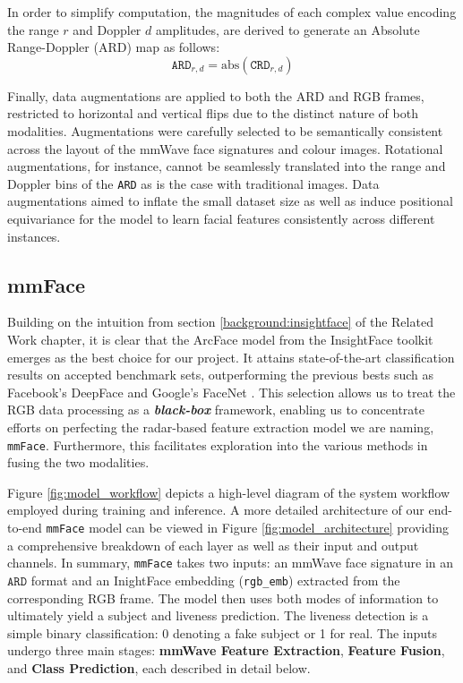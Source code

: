 \documentclass{mpaper}
\begin{document}
In order to simplify computation, the magnitudes of each complex value encoding the range $r$ and Doppler $d$ amplitudes, are derived to generate an Absolute Range-Doppler (ARD) map as follows:
$$\mathtt{ARD}_{r\!,d} = \text{abs}(\mathtt{CRD}_{r\!,d})$$

Finally, data augmentations are applied to both the ARD and RGB frames, restricted to horizontal and vertical flips due to the distinct nature of both modalities. Augmentations were carefully selected to be semantically consistent across the layout of the mmWave face signatures and colour images. Rotational augmentations, for instance, cannot be seamlessly translated into the range and Doppler bins of the \texttt{ARD} as is the case with traditional images. Data augmentations aimed to inflate the small dataset size as well as induce positional equivariance for the model to learn facial features consistently across different instances.


\subsection{mmFace}
Building on the intuition from section \ref{background:insightface} of the Related Work chapter, it is clear that the ArcFace model from the InsightFace toolkit emerges as the best choice for our project. It attains state-of-the-art classification results on accepted benchmark sets, outperforming the previous bests such as Facebook's DeepFace \cite{taigman2014deepface} and Google's FaceNet \cite{schroff2015facenet}. This selection allows us to treat the RGB data processing as a \textbf{\textit{black-box}} framework, enabling us to concentrate efforts on perfecting the radar-based feature extraction model we are naming, \texttt{mmFace}. Furthermore, this facilitates exploration into the various methods in fusing the two modalities. 

Figure \ref{fig:model_workflow} depicts a high-level diagram of the system workflow employed during training and inference. A more detailed architecture of our end-to-end \texttt{mmFace} model can be viewed in Figure \ref{fig:model_architecture} providing a comprehensive breakdown of each layer as well as their input and output channels. In summary, \texttt{mmFace} takes two inputs: an mmWave face signature in an $\mathtt{ARD}$ format and an InightFace embedding (\verb|rgb_emb|) extracted from the corresponding RGB frame. The model then uses both modes of information to ultimately yield a subject and liveness prediction. The liveness detection is a simple binary classification: 0 denoting a fake subject or 1 for real. The inputs undergo three main stages: \textbf{mmWave Feature Extraction}, \textbf{Feature Fusion}, and \textbf{Class Prediction}, each described in detail below.
\end{document}

